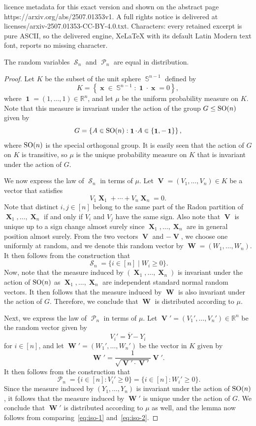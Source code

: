 \documentclass[10pt,a4paper]{amsart}
\DeclareMathOperator{\SO}{\textnormal{SO}} %
\DeclareMathOperator{\Vb}{\mathbf{V}} %
\DeclareMathOperator{\Wb}{\mathbf{W}} %
\DeclareMathOperator{\Xb}{\mathbf{X}} %
\DeclareMathOperator{\cP}{\mathcal{P}} %
\DeclareMathOperator{\cS}{\mathcal{S}} %
\DeclareMathOperator{\one}{\mathbf{1}} %
\DeclareMathOperator{\sphere}{\mathbb{S}} %
\DeclareMathOperator{\xb}{\mathbf{x}} %
\def\bY{\overline{Y}}
\def\rr{\mathbb{R}}
\begin{document}
licence metadata for this exact version and shown on the abstract page https://arxiv.org/abs/2507.01353v1. A full rights notice is delivered at licenses/arxiv-2507.01353-CC-BY-4.0.txt. Characters: every retained excerpt is pure ASCII, so the delivered engine, XeLaTeX with its default Latin Modern text font, reports no missing character.
\begin{lemma}\label{lem:iso}
	The random variables $\cS_n$ 	and $\cP_n$ are equal in distribution.
\end{lemma}

\begin{proof}
	Let $K$ be the subset of the unit sphere $\sphere^{n-1}$ defined by
	\[ K = \left \{ \xb \in \sphere^{n-1} : \one \cdot \xb=0 \right \}, \]
	where $\one=(1,\dots, 1) \in \rr^n$, and let $\mu$ be the uniform probability measure on $K$. Note that this measure is invariant under the action of the group $G \leq \SO(n)$ given by
	\[ G = \left \{ A \in \SO(n):  \one \cdot A \in \{\one,-\one\} \right\}, \]
    where $\SO(n)$ is the special orthogonal group.
	It is easily seen that the action of $G$ on $K$ is transitive, so $\mu$ is the unique probability measure on $K$ that is invariant under the action of $G$.

	We now express the law of $\cS_n$ in terms of $\mu$. Let $\Vb=(V_1,\dots, V_{n}) \in K$ be a vector that satisfies
	\[
		V_1 \Xb_1 + \cdots + V_{n} \Xb_{n} = 0.
	\]
	Note that distinct $i,j \in [n]$ belong to the same part of the Radon partition of $\Xb_1,\dots, \Xb_{n}$ if and only if $V_i$ and $V_j$ have the same sign. Also note that $\Vb$ is unique up to a sign change almost surely since $\Xb_1,\dots, \Xb_{n}$ are in general position almost surely. From the two vectors $\Vb$ and $-\Vb$, we choose one uniformly at random, and we denote this random vector by $\Wb=(W_1,\dots, W_{n})$. It then follows from the construction that
	\begin{equation}\label{eq:iso-1}
		\cS_n = \{ i \in [n] \mid W_i \geq 0 \}.
	\end{equation}
	Now, note that the measure induced by $(\Xb_1,\dots, \Xb_{n})$ is invariant under the action of $\SO(n)$ as $\Xb_1,\dots, \Xb_n$ are independent standard normal random vectors. It then follows that the measure induced by $\Wb$ is also invariant under the action of $G$. Therefore, we conclude that $\Wb$ is distributed according to $\mu$.


	Next, we express the law of $\cP_n$ in terms of $\mu$. Let $\Vb'=(V_1',\dots, V_n') \in \rr^n$ be the random vector given by
	\[ V_i' = \bY - Y_i \]
	for $i \in [n]$,  and let $\Wb'=(W_1',\dots, W_n')$ be the vector in $K$ given by
	\[ \Wb' = \frac{1}{\sqrt{\Vb' \cdot \Vb'}} \Vb'. \]
	It then follows from the construction that
	\begin{equation}\label{eq:iso-2}
		\cP_n = \{ i \in [n] :  V_i' \geq 0 \} = \{ i \in [n] :  W_i' \geq 0 \}.
	\end{equation}
	Since the measure induced by $(Y_1,\dots, Y_n)$ is invariant under the action of $\SO(n)$, it follows that the measure induced by $\Wb'$ is unique under the action of $G$. We conclude that $\Wb'$ is distributed according to $\mu$ as well, and the lemma now follows from comparing~\eqref{eq:iso-1} and~\eqref{eq:iso-2}.
\end{proof}
\end{document}
